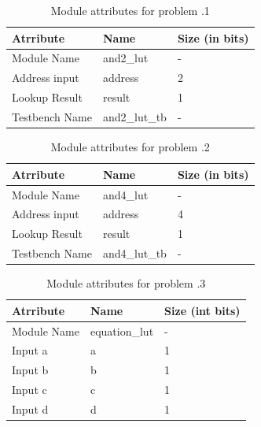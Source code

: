 \documentclass[a4paper,10pt]{article}
\theoremstyle{mytheor}
\newcounter{problemNumber}
\begin{document}
{   \begin{table}[!h]
     \centering
     \caption{Module attributes for problem \theproblemNumber.1}
     \label{table:problem-4.1-attr}
     \renewcommand{\arraystretch}{1.1} 
     \begin{tabularx}{0.8\textwidth}{|X|X|X|}
       \hline
       \rowcolor{greatblue}
       \color{white} Atrribute & \color{white}Name & \color{white}Size (in bits) \\
       \hline
       Module Name     & and2\_lut     &  -  \\
       Address input   & address       &  2  \\ 
       Lookup Result   & result        &  1  \\
       Testbench Name  & and2\_lut\_tb &  -  \\
       \hline
     \end{tabularx}
   \end{table}

   \begin{table}[!h]
     \centering
     \caption{Module attributes for problem \theproblemNumber.2}
     \label{table:problem-4.2-attr}
     \renewcommand{\arraystretch}{1.1} 
     \begin{tabularx}{0.8\textwidth}{|X|X|X|}
       \hline
       \rowcolor{greatblue}
       \color{white} Atrribute & \color{white}Name & \color{white}Size (in bits) \\
       \hline
       Module Name     & and4\_lut     &  -  \\
       Address input   & address       &  4  \\
       Lookup Result   & result        &  1  \\
       Testbench Name  & and4\_lut\_tb &  -  \\
       \hline
     \end{tabularx}
   \end{table}

   \begin{table}[!h]
     \centering
     \caption{Module attributes for problem \theproblemNumber.3}
     \label{table:problem-4.3-attr}
     \renewcommand{\arraystretch}{1.1} 
     \begin{tabularx}{0.8\textwidth}{|X|X|X|}
       \hline
       \rowcolor{greatblue}
       \color{white} Atrribute & \color{white}Name & \color{white}Size (int bits) \\
       \hline
       Module Name     & equation\_lut     &  -  \\
       Input a         & a                 &  1  \\
       Input b         & b                 &  1  \\
       Input c         & c                 &  1  \\
       Input d         & d                 &  1  \\


\end{tabularx}
\end{table}}
\end{document}
